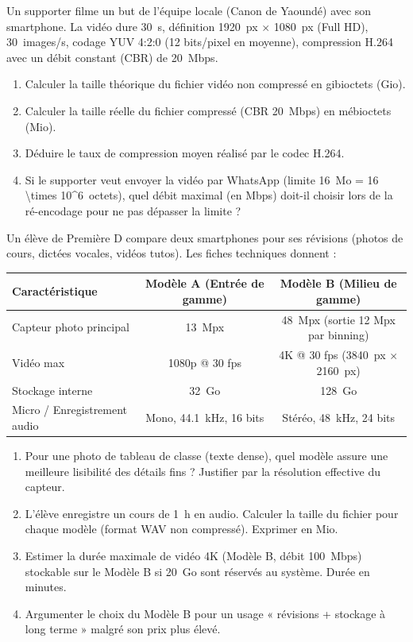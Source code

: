 \documentclass[11pt]{article}
\begin{document}
\begin{exercice}
Un supporter filme un but de l'équipe locale (Canon de Yaoundé) avec son smartphone. La vidéo dure \SI{30}{s}, définition \SI{1920}{px} $\times$ \SI{1080}{px} (Full HD), \SI{30}{images/s}, codage YUV 4:2:0 (12 bits/pixel en moyenne), compression H.264 avec un débit constant (CBR) de \SI{20}{Mbps}.
\begin{enumerate}
    \item Calculer la taille théorique du fichier vidéo non compressé en gibioctets (Gio).
    \item Calculer la taille réelle du fichier compressé (CBR \SI{20}{Mbps}) en mébioctets (Mio).
    \item Déduire le taux de compression moyen réalisé par le codec H.264.
    \item Si le supporter veut envoyer la vidéo par WhatsApp (limite \SI{16}{Mo} = \SI{16 \times 10^6}{octets}), quel débit maximal (en Mbps) doit-il choisir lors de la ré-encodage pour ne pas dépasser la limite ?
\end{enumerate}
\end{exercice}

\begin{exercice}
Un élève de Première D compare deux smartphones pour ses révisions (photos de cours, dictées vocales, vidéos tutos). Les fiches techniques donnent :
\begin{center}
\begin{tabular}{|l|c|c|}
\hline
\textbf{Caractéristique} & \textbf{Modèle A (Entrée de gamme)} & \textbf{Modèle B (Milieu de gamme)} \\ \hline
Capteur photo principal & \SI{13}{Mpx} & \SI{48}{Mpx} (sortie 12 Mpx par binning) \\
Vidéo max & 1080p @ 30 fps & 4K @ 30 fps (\SI{3840}{px} $\times$ \SI{2160}{px}) \\
Stockage interne & \SI{32}{Go} & \SI{128}{Go} \\
Micro / Enregistrement audio & Mono, \SI{44,1}{kHz}, 16 bits & Stéréo, \SI{48}{kHz}, 24 bits \\ \hline
\end{tabular}
\end{center}
\begin{enumerate}
    \item Pour une photo de tableau de classe (texte dense), quel modèle assure une meilleure lisibilité des détails fins ? Justifier par la résolution effective du capteur.
    \item L'élève enregistre un cours de \SI{1}{h} en audio. Calculer la taille du fichier pour chaque modèle (format WAV non compressé). Exprimer en Mio.
    \item Estimer la durée maximale de vidéo 4K (Modèle B, débit \SI{100}{Mbps}) stockable sur le Modèle B si \SI{20}{Go} sont réservés au système. Durée en minutes.
    \item Argumenter le choix du Modèle B pour un usage « révisions + stockage à long terme » malgré son prix plus élevé.
\end{enumerate}
\end{exercice}
\end{document}
